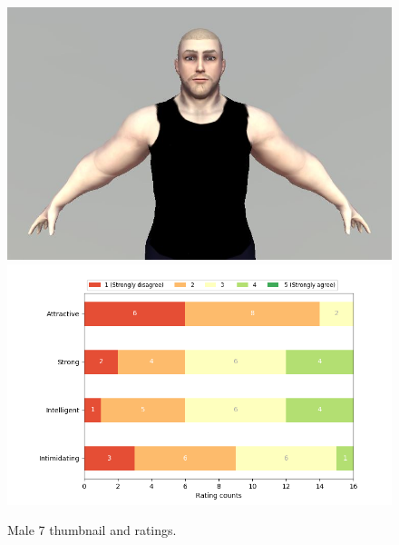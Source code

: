 \begin{figure}[H]
  \includegraphics[width=\linewidth]{Images/Males/7.JPG}
\endminipage\hfill
{}
  \includegraphics[width=\linewidth]{Survey/MRatings/avatar_m7.png}
\endminipage\hfill
\caption{Male 7 thumbnail and ratings.}
\end{figure}


